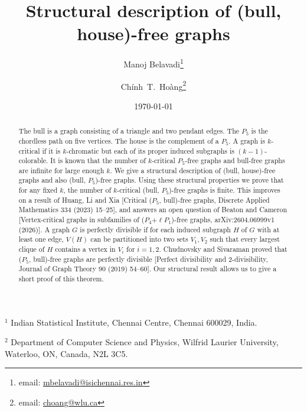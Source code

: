 \documentclass[a4paper,11pt]{article}
\title{Structural description of (bull, house)-free graphs}
\author{
  Manoj Belavadi\inst{1}\footnote{email: \href{mailto:mbelavadi@isichennai.res.in}{mbelavadi@isichennai.res.in}}
  \and 
  Ch\'inh~T.~Ho\`ang\inst{2}\footnote{email: \href{mailto:choang@wlu.ca}{choang@wlu.ca}}
  }
\date{\today}
\theoremstyle{case}
\def\inst#1{$^{#1}$}
\begin{document}
\maketitle
	\begin{center}
		{\footnotesize 
			
			\inst{1} Indian Statistical Institute, Chennai Centre, Chennai 600029, India. %
			
			\inst{2} Department of Computer Science and Physics, Wilfrid Laurier University, \\ Waterloo, ON, Canada, N2L 3C5. 
    }
		
	\end{center}

\begin{abstract}
The bull is a graph consisting of a triangle and two pendant edges. The $P_5$ is the chordless path on five vertices. The house is the complement of a $P_5$. A graph is $k$-critical if it is $k$-chromatic but each of its proper induced subgraphs is $(k-1)$-colorable. It is known that the number of $k$-critical $P_5$-free graphs and bull-free graphs are infinite for large enough $k$.  We give a structural description of (bull, house)-free graphs and also (bull, $P_5$)-free graphs. Using these structural properties we prove that for any fixed $k$, the number of  $k$-critical (bull, $P_5$)-free graphs is finite. This improves on a result of Huang, Li and Xia [Critical ($P_5$, bull)-free graphs, Discrete Applied Mathematics 334 (2023) 15–25], and answers an open question of Beaton and Cameron [Vertex-critical graphs in subfamilies of ($P_4$+$\ell P_1$)-free graphs, arXiv:2604.06999v1 (2026)]. A graph $G$ is perfectly divisible if for each induced subgraph $H$ of $G$ with at least one edge, $V(H)$ can be partitioned into two sets $V_1, V_2$ such that every largest clique of $H$ contains a vertex in $V_i$ for $i = 1,2$. Chudnovsky and Sivaraman proved that ($P_5$, bull)-free graphs are perfectly divisible [Perfect divisibility and 2-divisibility, Journal of Graph Theory 90 (2019) 54–60]. Our structural result allows us to give a short proof of this theorem.
\end{abstract}
\end{document}
